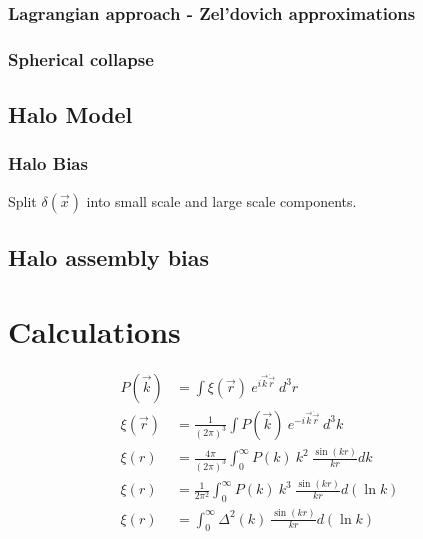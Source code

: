 \documentclass[12pt]{article}
\begin{document}
\subsubsection{Lagrangian approach - Zel'dovich approximations}
\subsubsection{Spherical collapse}

\subsection{Halo Model}
\subsubsection{Halo Bias}
Split $\delta(\vec{x})$ into small scale and large scale components. 

\subsection*{Halo assembly bias}

\newpage

\section*{Calculations}

\begin{align}
P(\vec{k}) &= \int \xi(\vec{r}) ~e^{i \vec{k} \dot \vec{r}} ~d^3r\\
\xi(\vec{r}) &= \frac{1}{(2\pi)^3} \int P(\vec{k}) ~e^{-i \vec{k} \dot \vec{r}} ~d^3 k\\
\xi(r) &= \frac{4 \pi}{(2\pi)^3} \int_{0}^{\infty} P(k) ~k^2 ~\frac{\sin(kr)}{kr} dk\\
\xi(r) &= \frac{1}{2\pi^2} \int_{0}^{\infty} P(k) ~k^3 ~\frac{\sin(kr)}{kr} d(\ln k)\\
\xi(r) &= \int_{0}^{\infty} \Delta^2(k) ~\frac{\sin(kr)}{kr} d(\ln k)
\end{align}
\end{document}
